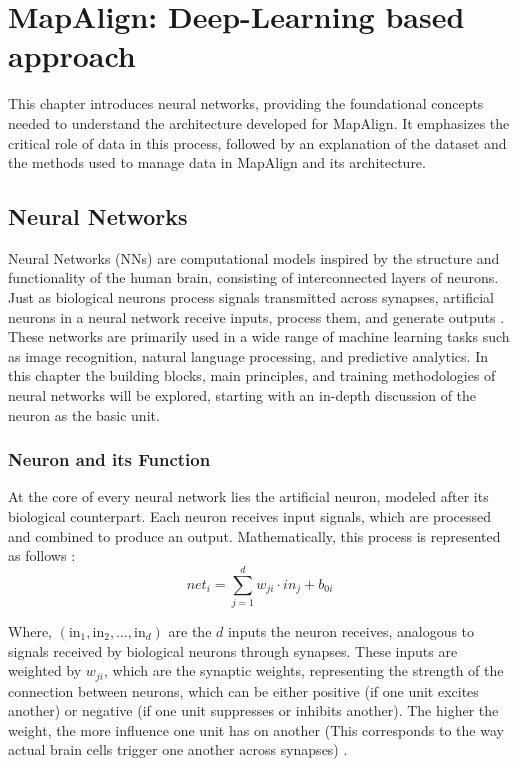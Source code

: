 \NoBgThispage
\chapter{MapAlign: Deep-Learning based approach}

This chapter introduces neural networks, providing the foundational concepts needed to understand the architecture developed for MapAlign. It emphasizes the critical role of data in this process, followed by an explanation of the dataset and the methods used to manage data in MapAlign and its architecture. 

\section{Neural Networks}
Neural Networks (NNs) are computational models inspired by the structure and functionality of the human brain, consisting of interconnected layers of neurons. Just as biological neurons process signals transmitted across synapses, artificial neurons in a neural network receive inputs, process them, and generate outputs \cite{Grosan2011}. These networks are primarily used in a wide range of machine learning tasks such as image recognition, natural language processing, and predictive analytics.
In this chapter the building blocks, main principles, and training methodologies of neural networks will be explored, starting with an in-depth discussion of the neuron as the basic unit.

\subsection{Neuron and its Function}
At the core of every neural network lies the artificial neuron, modeled after its biological counterpart. Each neuron receives input signals, which are processed and combined to produce an output. Mathematically, this process is represented as follows \cite{10.11648/j.ajnna.20190501.12}:
\begin{equation}
    \textit{net}_i = \sum_{j=1}^{d} w_{ji} \cdot \textit{in}_j + b_{0i}
\end{equation}

Where, $(\text{in}_1, \text{in}_2, \ldots, \text{in}_d)$ are the $d$ inputs the neuron receives, analogous to signals received by biological neurons through synapses. These inputs are weighted by $w_{ji}$, which are the synaptic weights, representing the strength of the connection between neurons, which can be either positive (if one unit excites another) or negative (if one unit suppresses or inhibits another). The higher the weight, the more influence one unit has on another (This corresponds to the way actual brain cells trigger one another across synapses) \cite{10.11648/j.ajnna.20190501.12}.

